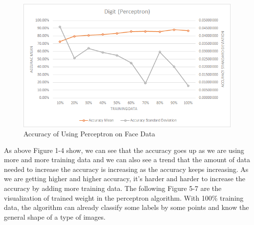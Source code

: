 \documentclass[11pt]{article}
\begin{document}
		\begin{figure}[H]
			\centering
			\includegraphics[scale=0.8]{Accuracy Face (Perceptron).jpg}
			\caption{Accuracy of Using Perceptron on Face Data}\label{fig:1}
		\end{figure}
		\flushleft{}As above Figure 1-4 show, we can see that the accuracy goes up as we are using more and more training data and we can also see a trend that the amount of data needed to increase the accuracy is increasing as the accuracy keeps increasing. As we are getting higher and higher accuracy, it’s harder and harder to increase the accuracy by adding more training data.
		\flushleft{}The following Figure 5-7 are the visualization of trained weight in the perceptron algorithm. With 100\% training data, the algorithm can already classify some labels by some points and know the general shape of a type of images.
\end{document}
